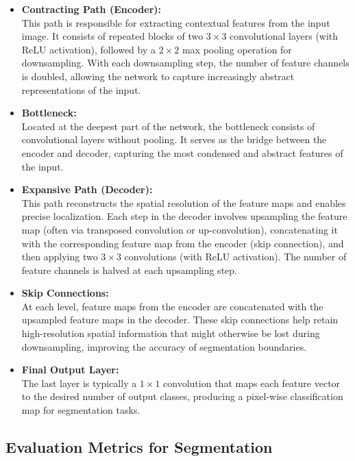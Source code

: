 \begin{itemize}
  \item \textbf{Contracting Path (Encoder):} \\
        This path is responsible for extracting contextual features from the input image. It consists of repeated blocks of two $3\times3$ convolutional layers (with ReLU activation), followed by a $2\times2$ max pooling operation for downsampling. With each downsampling step, the number of feature channels is doubled, allowing the network to capture increasingly abstract representations of the input.

  \item \textbf{Bottleneck:} \\
        Located at the deepest part of the network, the bottleneck consists of convolutional layers without pooling. It serves as the bridge between the encoder and decoder, capturing the most condensed and abstract features of the input.

  \item \textbf{Expansive Path (Decoder):} \\
        This path reconstructs the spatial resolution of the feature maps and enables precise localization. Each step in the decoder involves upsampling the feature map (often via transposed convolution or up-convolution), concatenating it with the corresponding feature map from the encoder (skip connection), and then applying two $3\times3$ convolutions (with ReLU activation). The number of feature channels is halved at each upsampling step.

  \item \textbf{Skip Connections:} \\
        At each level, feature maps from the encoder are concatenated with the upsampled feature maps in the decoder. These skip connections help retain high-resolution spatial information that might otherwise be lost during downsampling, improving the accuracy of segmentation boundaries.

  \item \textbf{Final Output Layer:} \\
        The last layer is typically a $1\times1$ convolution that maps each feature vector to the desired number of output classes, producing a pixel-wise classification map for segmentation tasks.
\end{itemize}


\subsection{Evaluation Metrics for Segmentation}
\label{sec:segmentation-metrics}

